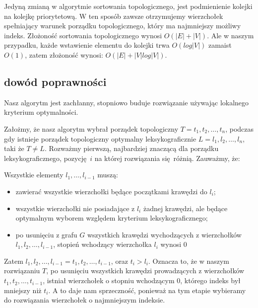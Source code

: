 Jedyną zmianą w algorytmie sortowania topologicznego, jest podmienienie kolejki na kolejkę priorytetową. W ten sposób zawsze otrzymujemy wierzchołek spełniający warunek porządku topologicznego, który ma najmniejszy możliwy indeks.
Złożoność sortowania topologicznego wynosi $O(|E| + |V|)$. Ale w naszym przypadku, każde wstawienie elementu do kolejki trwa $O(log |V|)$ zamaist $O(1)$, zatem złożoność wynosi: $O(|E| + |V| log |V|)$.

\subsection{dowód poprawności}
Nasz algorytm jest zachłanny, stopniowo buduje rozwiązanie używając lokalnego kryterium optymalności.

Założmy, że nasz algorytm wybrał porządek topologiczny $T = t_1,t_2, \dots, t_n$, podczas gdy istnieje porządek topologiczny optymalny leksykograficznie $L = l_1, l_2, \dots, l_n$, taki że $T \not = L$. Rozważmy pierwszą, najbardziej znaczącą dla porządku leksykograficznego, pozycję $i$ na której rozwiązania się różnią. Zauważmy, że:

Wszystkie elementy $l_1, \dots, l_{i-1}$ muszą:
\begin{itemize}
\item zawierać wszystkie wierzchołki będące początkami krawędzi do $l_i$;
\item wszystkie wierzchołki nie posiadające z $l_i$ żadnej krawędzi, ale będące optymalnym wyborem względem kryterium leksykograficznego;
\item po usunięciu z grafu $G$ wszystkich krawędzi wychodzących z wierzchołków $l_1,l_2, \dots, l_{i-1}$, stopień wchodzący wierzchołka $l_i$ wynosi $0$
\end{itemize}

Zatem $l_1,l_2, \dots, l_{i-1} = t_1, t_2, \dots, t_{i-1}$, oraz $t_i > l_i$. 
Oznacza to, że w naszym rozwiązaniu $T$, po usunięciu wszystkich krawędzi prowadzących z wierzchołków $t_1,t_2, \dots, t_{i-1}$, istniał wierzchołek o stopniu wchodzącym $0$, którego indeks był mniejszy niż $t_i$. A to daje nam sprzeczność, ponieważ na tym etapie wybieramy do rozwiązania wierzchołek o najmniejszym indeksie.

\section{}%
\\

